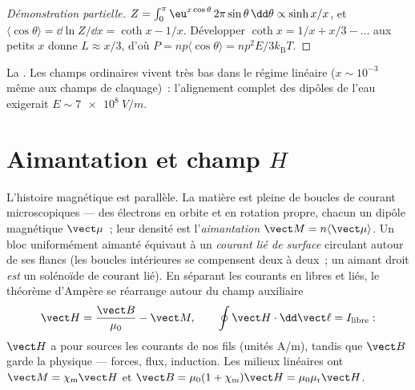 \begin{proof}[Démonstration partielle]
$Z = \int_0^\pi \eu^{x\cos\theta}\,2\pi\sin\theta\,\dd\theta \propto
\sinh x/x$, et $\langle\cos\theta\rangle = \dd\ln Z/\dd x = \coth x
- 1/x$. Développer $\coth x = 1/x + x/3 - \dots$ aux petits $x$ donne
$L \approx x/3$, d'où $P = np\langle\cos\theta\rangle =
np^2E/3k_{\text{B}}T$.
\end{proof}

\begin{omfigure}

{\small La . Les champs ordinaires vivent très bas
dans le régime linéaire ($x \sim 10^{-3}$ même aux champs de
claquage)~: l'alignement complet des dipôles de l'eau exigerait
$E \sim \qty{7e8}{V/m}$.}
\end{omfigure}

\section{Aimantation et champ \texorpdfstring{$H$}{H}}

\begin{definition}\label{def:b3:electromagnetism-in-matter:magnetisation}
L'histoire magnétique est parallèle. La matière est pleine de boucles
de courant microscopiques --- des électrons en orbite et en rotation
propre, chacun un dipôle magnétique $\vect\mu$~; leur densité est
l'\emph{aimantation} $\vect M = n\langle\vect\mu\rangle$. Un bloc
uniformément aimanté équivaut à un \emph{courant lié de surface}
circulant autour de ses flancs (les boucles intérieures se compensent
deux à deux~; un aimant droit \emph{est} un solénoïde de courant lié).
En séparant les courants en libres et liés, le théorème d'Ampère se
réarrange autour du champ auxiliaire
\[
\vect H = \frac{\vect B}{\mu_0} - \vect M , \qquad
\oint \vect H\cdot\dd\vect\ell = I_{\text{libre}} :
\]
$\vect H$ a pour sources les courants de nos fils (unités
\unit{A/m}), tandis que $\vect B$ garde la physique --- forces, flux,
induction. Les milieux linéaires ont $\vect M = \chi_{\text{m}}\vect H$
et $\vect B = \mu_0(1 + \chi_{\text{m}})\vect H =
\mu_0\mu_{\text{r}}\vect H$.
\end{definition}

